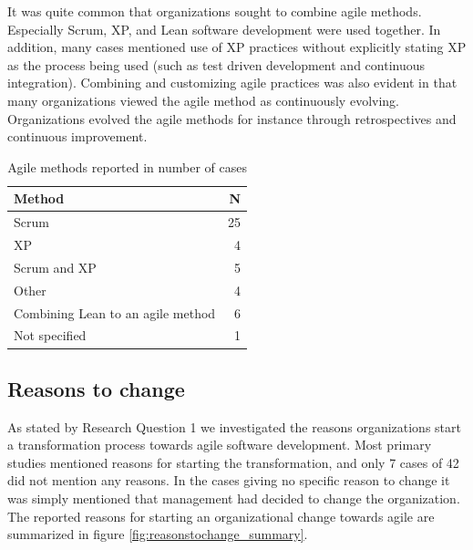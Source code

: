 \documentclass[preprint,authoryear,12pt]{elsarticle}
\begin{document}
It was quite common that organizations sought to combine agile methods.
Especially Scrum, XP, and Lean software development were used together. In
addition, many cases mentioned use of XP practices without explicitly stating XP
as the process being used (such as test driven development and continuous
integration). Combining and customizing agile practices was also evident in that
many organizations viewed the agile method as continuously evolving.
Organizations evolved the agile methods for instance through retrospectives and
continuous improvement.

\begin{table}[h]
    \centering
    \begin{tabular}{ l r }
        \toprule
        Method                             &  N  \\
        \midrule
        Scrum                              &  25 \\
        XP                                 &  4  \\
        Scrum and XP                       &  5  \\
        Other                              &  4  \\
        Combining Lean to an agile method  &  6  \\
        Not specified                      &  1  \\
        \bottomrule
    \end{tabular}
    \caption{Agile methods reported in number of cases}
    \label{table:agilemethods}
\end{table}


\clearpage

\subsection{Reasons to change}

As stated by Research Question 1 we investigated the reasons organizations start
a transformation process towards agile software development. Most primary
studies mentioned reasons for starting the transformation, and only 7 cases of
42 did not mention any reasons. In the cases giving no specific reason to change
it was simply mentioned that management had decided to change the organization.
The reported reasons for starting an organizational change towards agile are
summarized in figure \ref{fig:reasonstochange_summary}.

\end{document}
